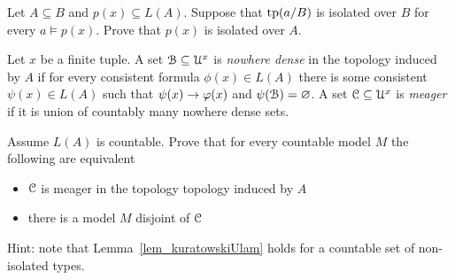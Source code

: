 \begin{exercise} 
  Let $A\subseteq B$ and $p(x)\subseteq L(A)$. 
  Suppose that ${\rm tp}(a/B)$ is isolated over $B$ for every $a\models p(x)$.
  Prove that $p(x)$ is isolated over $A$.
\end{exercise}

\begin{exercise}
  Let $x$ be a finite tuple.
  A set $\EuScript B\subseteq\EuScript U^x$ is \textit{nowhere dense\/} in the topology induced by $A$ if for every consistent formula $\phi(x)\in L(A)$ there is some consistent $\psi(x)\in L(A)$ such that $\psi(x)\rightarrow\varphi(x)$ and $\psi(\EuScript B)=\varnothing$.
  A set $\EuScript C\subseteq\EuScript U^x$ is \textit{meager\/} if it is union of countably many nowhere dense sets.
  
  Assume $L(A)$ is countable.
  Prove that for every countable model $M$ the following are equivalent
  \begin{itemize}
    \item [1.] $\EuScript C$ is meager in the topology topology induced by $A$
    \item [2.] there is a model $M$ disjoint of $\EuScript C$
  \end{itemize}
  Hint: note that Lemma~\ref{lem_kuratowskiUlam} holds for a countable set of non-isolated types.
\end{exercise}

